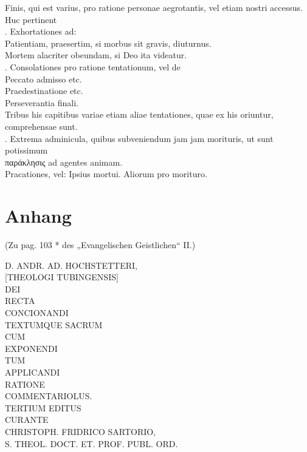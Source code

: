 Finis, qui est varius, pro ratione personae aegrotantis, vel etiam nostri accessus. Huc pertinent\\
. Exhortationes ad:\\
\quad\quad Patientiam, praesertim, si morbus sit gravis, diuturnus.\\
\quad\quad Mortem alacriter obeundam, si Deo ita videatur.\\
. Consolationes pro ratione tentationum, vel de\\
\quad\quad Peccato admisso etc.\\
\quad\quad Praedestinatione etc.\\
\quad\quad Perseverantia finali.\\
\quad\quad Tribus his capitibus variae etiam aliae tentationes, quae ex his oriuntur, comprehensae sunt.\\
. Extrema adminicula, quibus subveniendum jam jam morituris, ut sunt potissimum\\
\quad\quad παράκλησις ad agentes animam.\\
\quad\quad Pracationes, vel: Ipsius mortui. Aliorum pro morituro.
\chapter{Anhang}

\begin{titelseite}
(Zu pag. 103 * des „Evangelischen Geistlichen“ II.)

\begin{center}
{\large D. ANDR. AD. HOCHSTETTERI,}\\[0.6em]
{\large [THEOLOGI TUBINGENSIS]}\\[1.2em]
DEI\\
RECTA\\
CONCIONANDI\\
TEXTUMQUE SACRUM\\
CUM\\
EXPONENDI\\
TUM\\
APPLICANDI\\
RATIONE\\
COMMENTARIOLUS.\\[1em]
TERTIUM EDITUS\\
CURANTE\\
CHRISTOPH. FRIDRICO SARTORIO,\\
S. THEOL. DOCT. ET. PROF. PUBL. ORD.
\end{center}
\end{titelseite}

